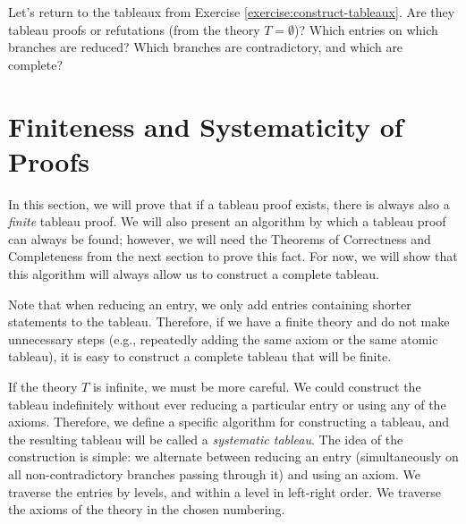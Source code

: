 \begin{exercise}
    Let's return to the tableaux from Exercise \ref{exercise:construct-tableaux}. Are they tableau proofs or refutations (from the theory $T = \emptyset$)? Which entries on which branches are reduced? Which branches are contradictory, and which are complete?
\end{exercise}

\section{Finiteness and Systematicity of Proofs}\label{section:finiteness-and-systematicity-of-proofs}

In this section, we will prove that if a tableau proof exists, there is always also a \emph{finite} tableau proof. We will also present an algorithm by which a tableau proof can always be found; however, we will need the Theorems of Correctness and Completeness from the next section to prove this fact. For now, we will show that this algorithm will always allow us to construct a complete tableau.

Note that when reducing an entry, we only add entries containing shorter statements to the tableau. Therefore, if we have a finite theory and do not make unnecessary steps (e.g., repeatedly adding the same axiom or the same atomic tableau), it is easy to construct a complete tableau that will be finite.

If the theory $T$ is infinite, we must be more careful. We could construct the tableau indefinitely without ever reducing a particular entry or using any of the axioms. Therefore, we define a specific algorithm for constructing a tableau, and the resulting tableau will be called a \emph{systematic tableau}. The idea of the construction is simple: we alternate between reducing an entry (simultaneously on all non-contradictory branches passing through it) and using an axiom. We traverse the entries by levels, and within a level in left-right order. We traverse the axioms of the theory in the chosen numbering.

